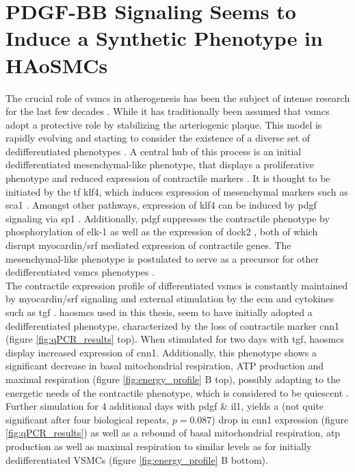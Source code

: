 \section{PDGF-BB Signaling Seems to Induce a Synthetic Phenotype in HAoSMCs}
The crucial role of \acp{vsmc} in atherogenesis has been the subject of intense research for the last few decades \cite{grootaertVascularSmoothMuscle2021, yapSixShadesVascular2021}. While it has traditionally been assumed that \acp{vsmc} adopt a protective role by stabilizing the arteriogenic plaque. This model is rapidly evolving and starting to consider the existence of a diverse set of dedifferentiated phenotypes \cite{liuSmoothMuscleCell2019}. A central hub of this process is an initial dedifferentiated mesenchymal-like phenotype, that displays a proliferative phenotype and reduced expression of contractile markers \cite{yapSixShadesVascular2021}. It is thought to be initiated by the \ac{tf} \ac{klf4}, which induces expression of mesenchymal markers such as \ac{sca1} \cite{yapSixShadesVascular2021}. Amongst other pathways, expression of \ac{klf4} can be induced by \ac{pdgf} signaling \cite{liuKruppellikeFactorAbrogates2005} via \ac{sp1} \cite{deatonSp1dependentActivationKLF42009}. Additionally, \ac{pdgf} suppresses the contractile phenotype by phosphorylation of \ac{elk-1} \cite{wangMyocardinTernaryComplex2004} as well as the expression of \ac{dock2} \cite{guoDedicatorCytokinesisNovel2015}, both of which disrupt myocardin/\ac{srf} mediated expression of contractile genes. The mesenchymal-like phenotype is postulated to serve as a precursor for other dedifferentiated \acp{vsmc} phenotypes \cite{yapSixShadesVascular2021}.\\
The contractile expression profile of differentiated \acp{vsmc} is constantly maintained by myocardin/\ac{srf} signaling \cite{longMyocardinSufficientSmooth2008} and external stimulation by the \ac{ecm} and cytokines such as \ac{tgf} \cite{davis-dusenberyDownregulationKruppellikeFactor42011}. \acp{haosmc} used in this thesis, seem to have initially adopted a dedifferentiated phenotype, characterized by the loss of contractile marker \ac{cnn1} \cite{owensMolecularRegulationVascular2004} (figure \ref{fig:qPCR_results} top). When stimulated for two days with \ac{tgf}, \acp{haosmc} display increased expression of \ac{cnn1}. Additionally, this phenotype shows a significant decrease in  basal mitochondrial respiration, ATP production and maximal respiration (figure \ref{fig:energy_profile} B top), possibly adapting to the energetic needs of the contractile phenotype, which is considered to be quiescent \cite{dobnikarDiseaserelevantTranscriptionalSignatures2018}. Further simulation for 4 additional days with \ac{pdgf} \& \ac{il1}, yields a (not quite significant after four biological repeats, $p=0.087$) drop in \ac{cnn1} expression (figure \ref{fig:qPCR_results}) as well as a rebound of basal mitochondrial respiration, \ac{atp} production as well as maximal respiration to similar levels as for initially dedifferentiated VSMCs (figure \ref{fig:energy_profile} B bottom).\\
